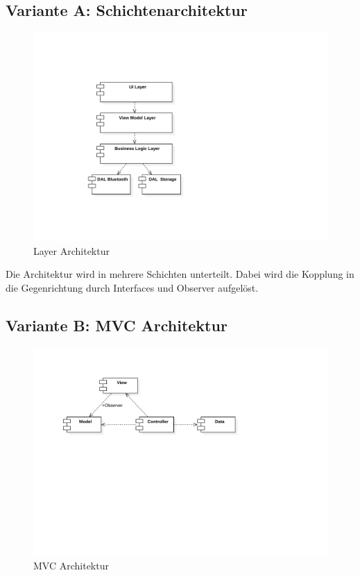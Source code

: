 \subsection{Variante A: Schichtenarchitektur}
\begin{figure}[H]
    \begin{center}
        \includegraphics[trim=-100 130 140 110,clip,width=\textwidth]{design/res/layers}
    \end{center}
    \caption{Layer Architektur}
\end{figure}

Die Architektur wird in mehrere Schichten unterteilt. Dabei wird die Kopplung in die Gegenrichtung durch Interfaces und Observer aufgelöst.

\subsection{Variante B: MVC Architektur}
\begin{figure}[H]
    \begin{center}
        \includegraphics[trim=0 330 140 60,clip,width=\textwidth]{design/res/mvc}
    \end{center}
    \caption{MVC Architektur}
\end{figure}

